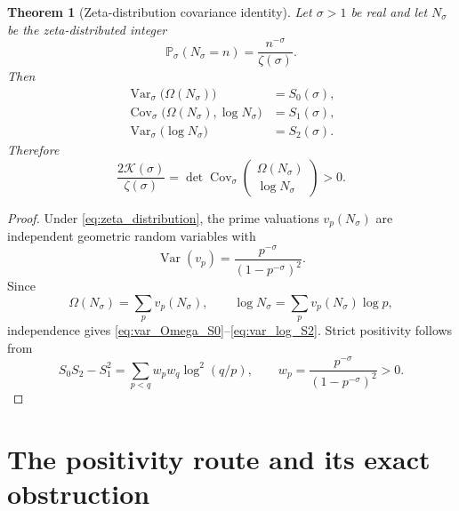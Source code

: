 \documentclass[11pt]{amsart}
\numberwithin{equation}{section}
\theoremstyle{plain}
\newtheorem{theorem}{Theorem}[section]
\theoremstyle{definition}
\theoremstyle{remark}
\begin{document}
\begin{theorem}[Zeta-distribution covariance identity]
\label{thm:zeta_covariance_identity}
Let \(\sigma>1\) be real and let \(N_\sigma\) be the zeta-distributed integer
\begin{equation}
\mathbb P_\sigma(N_\sigma=n)=\frac{n^{-\sigma}}{\zeta(\sigma)}.
\label{eq:zeta_distribution}
\end{equation}
Then
\begin{align}
\operatorname{Var}_\sigma\!\bigl(\Omega(N_\sigma)\bigr)&=S_0(\sigma),
\label{eq:var_Omega_S0}\\
\operatorname{Cov}_\sigma\!\bigl(\Omega(N_\sigma),\log N_\sigma\bigr)&=S_1(\sigma),
\label{eq:cov_Omega_log_S1}\\
\operatorname{Var}_\sigma\!\bigl(\log N_\sigma\bigr)&=S_2(\sigma).
\label{eq:var_log_S2}
\end{align}
Therefore
\begin{equation}
\boxed{
\frac{2\mathcal K(\sigma)}{\zeta(\sigma)}
=\det\operatorname{Cov}_\sigma\!\begin{pmatrix}
\Omega(N_\sigma)\\ \log N_\sigma
\end{pmatrix}>0.}
\label{eq:K_covariance_determinant}
\end{equation}
\end{theorem}

\begin{proof}
Under \eqref{eq:zeta_distribution}, the prime valuations \(v_p(N_\sigma)\)
are independent geometric random variables with
\begin{equation}
\operatorname{Var}(v_p)=\frac{p^{-\sigma}}{(1-p^{-\sigma})^2}.
\label{eq:geometric_prime_variance}
\end{equation}
Since
\begin{equation}
\Omega(N_\sigma)=\sum_p v_p(N_\sigma),
\qquad
\log N_\sigma=\sum_p v_p(N_\sigma)\log p,
\label{eq:Omega_log_prime_valuations}
\end{equation}
independence gives \eqref{eq:var_Omega_S0}--\eqref{eq:var_log_S2}.
Strict positivity follows from
\begin{equation}
S_0S_2-S_1^2
=\sum_{p<q}w_p w_q\log^2(q/p),
\qquad
w_p=\frac{p^{-\sigma}}{(1-p^{-\sigma})^2}>0.
\label{eq:strict_covariance_determinant}
\end{equation}
\end{proof}

\section{The positivity route and its exact obstruction}
\label{sec:positivity_barrier}
\end{document}
